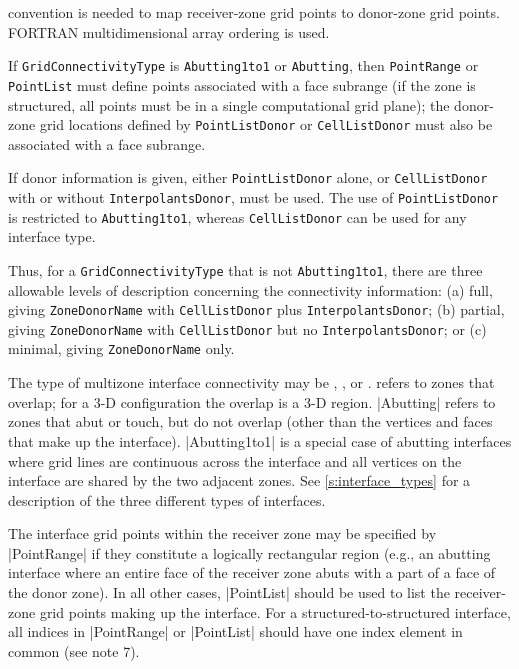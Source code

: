 \begin{notes}
      convention is needed to map receiver-zone grid points to
      donor-zone grid points.
      FORTRAN multidimensional array ordering is used.
\item If \texttt{GridConnectivityType} is \texttt{Abutting1to1} or
      \texttt{Abutting}, then \texttt{PointRange} or \texttt{PointList}
      must define points associated with a face subrange (if
      the zone is structured, all points must be in a single
      computational grid plane); the donor-zone grid locations defined
      by \texttt{PointListDonor} or \texttt{CellListDonor} must also be
      associated with a face subrange.
\item If donor information is given, either \texttt{PointListDonor}
      alone, or \texttt{CellListDonor} with or without
      \texttt{InterpolantsDonor}, must be used.
      The use of \texttt{PointListDonor} is restricted to
      \texttt{Abutting1to1}, whereas \texttt{CellListDonor} can be used
      for any interface type.
\item Thus, for a \texttt{GridConnectivityType} that is not
      \texttt{Abutting1to1}, there are three allowable levels of
      description concerning the connectivity information: (a) full,
      giving \texttt{ZoneDonorName} with \texttt{CellListDonor}
      plus \texttt{InterpolantsDonor}; (b) partial, giving
      \texttt{ZoneDonorName} with \texttt{CellListDonor} but
      no \texttt{InterpolantsDonor}; or (c) minimal, giving
      \texttt{ZoneDonorName} only.
\end{notes}

The type of multizone interface connectivity may be ,
, or .
 refers to zones that overlap; for a 3-D configuration the
overlap is a 3-D region.
|Abutting| refers to zones that abut or touch, but do not overlap (other
than the vertices and faces that make up the interface).
|Abutting1to1| is a special case of abutting interfaces where grid lines
are continuous across the interface and all vertices on the interface
are shared by the two adjacent zones.
See \autoref{s:interface_types} for a description of the three different
types of interfaces.

The interface grid points within the receiver zone may be specified by
|PointRange| if they constitute a logically rectangular region (e.g., an
abutting interface where an entire face of the receiver zone abuts with a
part of a face of the donor zone).  In all other cases, |PointList| should be
used to list the receiver-zone grid points making up the interface.
For a structured-to-structured interface, all indices in |PointRange| or
|PointList| should have one index element in common (see note 7).

